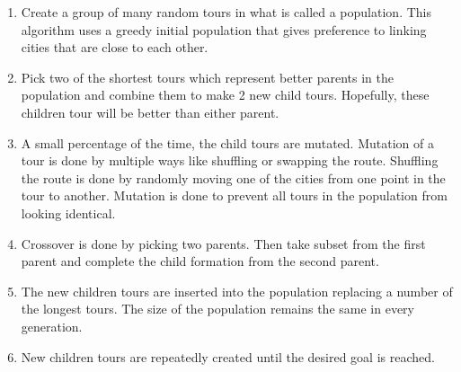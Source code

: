 

\begin{enumerate}
\item Create a group of many random tours in what is called a population. This algorithm uses a greedy initial population that gives preference to linking cities that are close to each other.
\item Pick two of the shortest tours which represent better parents in the population and combine them to make 2 new child tours. Hopefully, these children tour will be better than either parent.
\item A small percentage of the time, the child tours are mutated. Mutation of a tour is done by multiple ways like shuffling or swapping the route. Shuffling the route is done by randomly moving one of the cities from one point in the tour to another. Mutation is done to prevent all tours in the population from looking identical.
\item Crossover is done by picking two parents. Then take subset from the first parent and complete the child formation from the second parent.
\item The new children tours are inserted into the population replacing a number of the longest tours. The size of the population remains the same in every generation.
\item New children tours are repeatedly created until the desired goal is reached.
\end{enumerate} 


